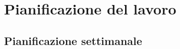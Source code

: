 
\section*{Pianificazione del lavoro}

\subsection*{Pianificazione settimanale}
\prospettoSettimanale
